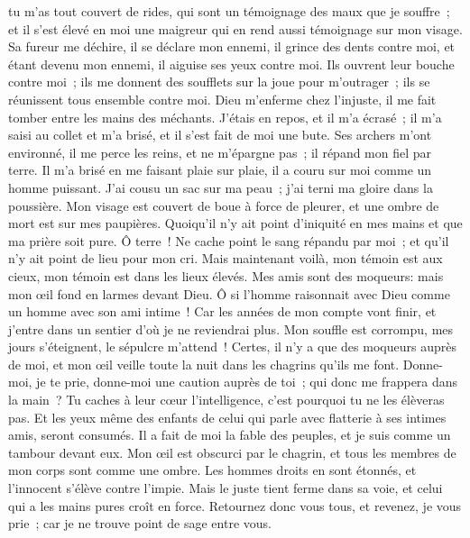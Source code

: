 \begin{multicols}{2}
tu m'as tout couvert de rides, qui sont un témoignage des maux que je souffre~; et il s'est élevé en moi une maigreur qui en rend aussi témoignage sur mon visage. 
Sa fureur me déchire, il se déclare mon ennemi, il grince des dents contre moi, et étant devenu mon ennemi, il aiguise ses yeux contre moi.
Ils ouvrent leur bouche contre moi~; ils me donnent des soufflets sur la joue pour m'outrager~; ils se réunissent tous ensemble contre moi. 
Dieu m'enferme chez l'injuste, il me fait tomber entre les mains des méchants. 
J'étais en repos, et il m'a écrasé~; il m'a saisi au collet et m'a brisé, et il s'est fait de moi une bute.
Ses archers m'ont environné, il me perce les reins, et ne m'épargne pas~; il répand mon fiel par terre. 
Il m'a brisé en me faisant plaie sur plaie, il a couru sur moi comme un homme puissant.
J'ai cousu un sac sur ma peau~; j'ai terni ma gloire dans la poussière.
Mon visage est couvert de boue à force de pleurer, et une ombre de mort est sur mes paupières. 
Quoiqu'il n'y ait point d'iniquité en mes mains et que ma prière soit pure.
Ô terre~! Ne cache point le sang répandu par moi~; et qu'il n'y ait point de lieu pour mon cri.
Mais maintenant voilà, mon témoin est aux cieux, mon témoin est dans les lieux élevés.
Mes amis sont des moqueurs: mais mon œil fond en larmes devant Dieu.
Ô si l'homme raisonnait avec Dieu comme un homme avec son ami intime~! 
Car les années de mon compte vont finir, et j'entre dans un sentier d'où je ne reviendrai plus. 
\VerseOne{}Mon souffle est corrompu, mes jours s'éteignent, le sépulcre m'attend~!
Certes, il n'y a que des moqueurs auprès de moi, et mon œil veille toute la nuit dans les chagrins qu'ils me font.
Donne-moi, je te prie, donne-moi une caution auprès de toi~; qui donc me frappera dans la main~?
Tu caches à leur cœur l'intelligence, c'est pourquoi tu ne les élèveras pas.
Et les yeux même des enfants de celui qui parle avec flatterie à ses intimes amis, seront consumés.
Il a fait de moi la fable des peuples, et je suis comme un tambour devant eux.
Mon œil est obscurci par le chagrin, et tous les membres de mon corps sont comme une ombre.
Les hommes droits en sont étonnés, et l'innocent s'élève contre l'impie.
Mais le juste tient ferme dans sa voie, et celui qui a les mains pures croît en force. 
Retournez donc vous tous, et revenez, je vous prie~; car je ne trouve point de sage entre vous. 

\end{multicols}
